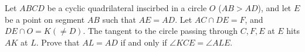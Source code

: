 Let $ABCD$ be a cyclic quadrilateral inscirbed in a circle $O$ ($AB> AD$), and let $E$ be a point on segment $AB$ such that $AE = AD$. Let $AC \cap DE = F$, and $DE \cap  O = K(\ne D)$. The tangent to the circle passing through $C,F,E$ at $E$ hits $AK$ at $L$. Prove that $AL = AD$ if and only if $\angle KCE = \angle ALE$.